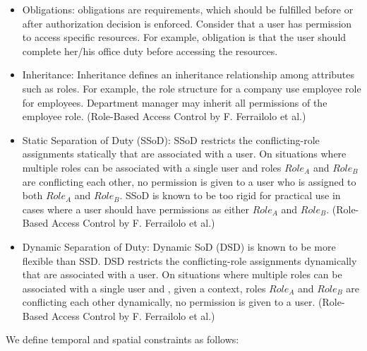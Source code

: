 \begin{itemize}


	\item Obligations: obligations are requirements, which should be fulfilled before or after authorization decision is enforced.
	Consider that a user has permission to access specific resources. For example, obligation is that the user should complete
	her/his office duty before accessing the resources.
	
	\item Inheritance:
	Inheritance defines an inheritance relationship among attributes such as roles. For example, the role structure for a company use
	employee role for employees. Department manager may inherit all permissions of the employee role. (Role-Based Access Control by F. Ferrailolo et al.)
	
	\item Static Separation of Duty (SSoD): SSoD restricts the conflicting-role assignments statically that are associated with a user. On situations
	where multiple roles can be associated with a single user and roles $Role_A$ and $Role_B$ are conflicting each other, no permission is given to a user who is assigned to both $Role_A$ and $Role_B$. SSoD is known to be too rigid for practical use in cases where a user should have permissions as either $Role_A$ and $Role_B$. (Role-Based Access Control by F. Ferrailolo et al.)

	\item Dynamic Separation of Duty: Dynamic SoD (DSD) is known to be
more flexible than SSD. DSD restricts the conflicting-role assignments dynamically that are associated with a user. On situations
	where multiple roles can be associated with a single user and , given a context, roles $Role_A$ and $Role_B$ are conflicting each other dynamically, no permission is given to a user. (Role-Based Access Control by F. Ferrailolo et al.)
	\end{itemize} 

We define temporal and spatial constraints as follows:

